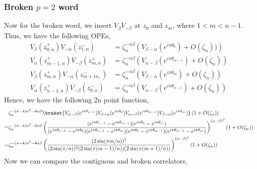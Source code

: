 \documentclass[11pt]{article}
\newcommand{\lb}{\left(}
\newcommand{\rb}{\right)}
\begin{document}
\subsubsection{\texorpdfstring{Broken $p=2$ word}{Broken p=2 word}}
Now for the broken word, we insert $V_\beta V_{-\beta}$ at $z_0$ and $z_m$, where $1<m<n-1$. Thus, we have the following OPEs,
\begin{align}
    V_\beta(z_{0,n}^+) V_{-\alpha}(z_{1,n}^-) &= \zeta_n^{-\alpha \beta}\lb V_{\beta - \alpha}(e^{i\pi\theta_0}) + O(\zeta_n))\rb \\
    V_{\alpha}(z_{m-1,n}^+) V_{-\beta}(z_{m,n}^+) &= \zeta_n^{-\alpha\beta} \lb V_{\alpha -\beta}(e^{i\pi\theta_{m-1}}) + O(\zeta_n) \rb \\
    V_\beta(z_{m,n}^+)V_{-\alpha}(z_{m+1n,}^-) &= \zeta_n^{-\alpha\beta} \lb V_{\beta - \alpha}(e^{i\pi \theta_{m}})+ O(\zeta_n)\rb \\
    V_\alpha(z_{n-1,n}^+)V_{-\beta}(z_{0,n}^-) &= \zeta_n^{-\alpha\beta} \lb V_{\alpha - \beta}(e^{i\pi \theta_{n-1}})+ O(\zeta_n)\rb 
\end{align}
Hence, we have the following 2n point function,
\begin{align}
    &\zeta_n^{-(n-4)\alpha^2 -4\alpha\beta} \braket{V_{\alpha - \beta}(e^{i\pi \theta_{n-1}})V_{\beta - \alpha}(e^{i\pi\theta_0})V_{\alpha -\beta}(e^{i\pi\theta_{m-1}})V_{\beta - \alpha}(e^{i\pi \theta_{m}})}\lb 1+ O(\zeta_n)\rb \\
    =& \zeta_n^{-(n-4)\alpha^2 -4\alpha\beta} \lb\frac{(e^{i\pi\theta_{n-1}} - e^{i\pi\theta_{m-1}})(e^{i\pi\theta_{0}} - e^{i\pi\theta_{m}})}{(e^{i\pi\theta_{n-1}} - e^{i\pi\theta_{0}})(e^{i\pi\theta_{n-1}} - e^{i\pi\theta_{m}})(e^{i\pi\theta_{0}} - e^{i\pi\theta_{m-1}})(e^{i\pi\theta_{m-1}} - e^{i\pi\theta_{m}})}\rb^{(\alpha - \beta)^2} \lb 1 + O(\zeta_n)\rb \\
    =&\zeta_n^{-(n-4)\alpha^2 -4\alpha\beta}\lb\frac{(2\sin(\pi m /n))^2}{(2\sin(\pi/n))^2(2\sin(\pi(m-1)/n))(2\sin(\pi (m+1)/n))}\rb^{(\alpha - \beta)^2}  \lb 1 + O(\zeta_n)\rb 
\end{align}
Now we can compare the contiguous and broken correlators,
\end{document}
